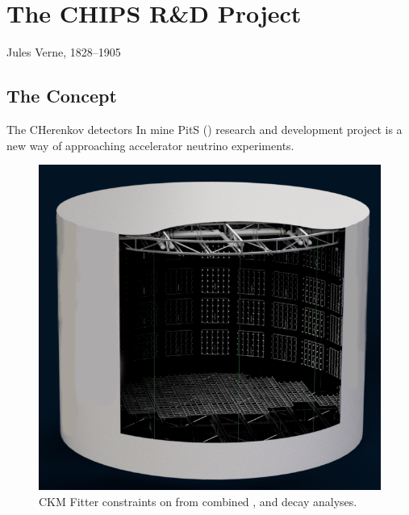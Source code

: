 \chapter{The CHIPS R\&D Project}
\label{chap:chips}

{Jules Verne, 1828--1905}

\section{The \chips Concept}
The CHerenkov detectors In mine PitS (\chips) research and development project is a
new way of approaching accelerator neutrino experiments.


\begin{figure}
    \includegraphics[width=\largefigwidth]{diagrams/chips_render_1}
    \caption[CKM Fitter constraints on \alphaCKM.]%
    {CKM Fitter constraints on \alphaCKM from combined \BToPiPi,
        \BToRhoPi and \BToRhoRho decay analyses.}
    \label{fig:chips_render_1}
\end{figure}

